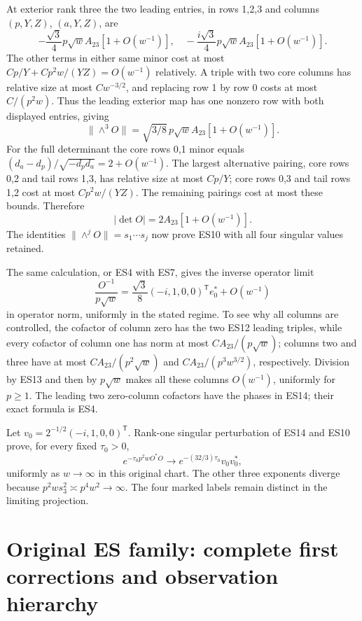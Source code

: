\documentclass[11pt]{article}
\begin{document}
At exterior rank three the two leading entries, in rows 1,2,3 and columns \((p,Y,Z)\), \((a,Y,Z)\), are \[
-\frac{\sqrt3}{4}p\sqrt w A_{23}[1+O(w^{-1})],\quad
-\frac{i\sqrt3}{4}p\sqrt w A_{23}[1+O(w^{-1})].
\] The other terms in either same minor cost at most \(Cp/Y+Cp^2w/(YZ)=O(w^{-1})\) relatively. A triple with two core columns has relative size at most \(Cw^{-3/2}\), and replacing row 1 by row 0 costs at most \(C/(p^2w)\). Thus the leading exterior map has one nonzero row with both displayed entries, giving \[
\|\wedge^3O\|=\sqrt{3/8}\,p\sqrt w A_{23}[1+O(w^{-1})].
\tag{ES12}
\] For the full determinant the core rows 0,1 minor equals \((d_a-d_p)/\sqrt{-d_pd_a}=2+O(w^{-1})\). The largest alternative pairing, core rows 0,2 and tail rows 1,3, has relative size at most \(Cp/Y\); core rows 0,3 and tail rows 1,2 cost at most \(Cp^2w/(YZ)\). The remaining pairings cost at most these bounds. Therefore \[
|\det O|=2A_{23}[1+O(w^{-1})].
\tag{ES13}
\] The identities \(\|\wedge^jO\|=s_1\cdots s_j\) now prove ES10 with all four singular values retained.

The same calculation, or ES4 with ES7, gives the inverse operator limit \[
\frac{O^{-1}}{p\sqrt w}=\frac{\sqrt3}{8}(-i,1,0,0)^{\mathsf T}e_0^*+O(w^{-1})
\tag{ES14}
\] in operator norm, uniformly in the stated regime. To see why all columns are controlled, the cofactor of column zero has the two ES12 leading triples, while every cofactor of column one has norm at most \(CA_{23}/(p\sqrt w)\); columns two and three have at most \(CA_{23}/(p^2\sqrt w)\) and \(CA_{23}/(p^3w^{3/2})\), respectively. Division by ES13 and then by \(p\sqrt w\) makes all these columns \(O(w^{-1})\), uniformly for \(p\ge1\). The leading two zero-column cofactors have the phases in ES14; their exact formula is ES4.

Let \(v_0=2^{-1/2}(-i,1,0,0)^{\mathsf T}\). Rank-one singular perturbation of ES14 and ES10 prove, for every fixed \(\tau_0>0\), \[
e^{-\tau_0p^2wO^*O}\longrightarrow e^{-(32/3)\tau_0}v_0v_0^*,
\tag{ES15}
\] uniformly as \(w\to\infty\) in this original chart. The other three exponents diverge because \(p^2w s_3^2\asymp p^4w^2\to\infty\). The four marked labels remain distinct in the limiting projection.

\section{Original ES family: complete first corrections and observation hierarchy}\label{original-es-family-complete-first-corrections-and-observation-hierarchy}
\end{document}
